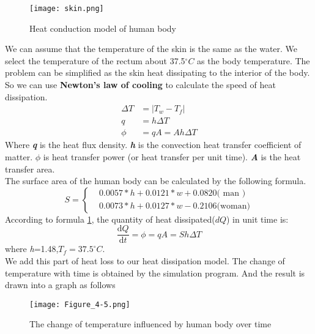\documentclass{mcmthesis}
\begin{document}
\begin{figure}[H]
\centerline{\texttt{[image: skin.png]}}
\caption{Heat conduction model of human body}
\label{skin}
\end{figure}
\indent We can assume that the temperature of the skin is the same as the water. We select the temperature of the rectum about 37.5$^{\circ}C$ as the body temperature. The problem can be simplified as the skin heat dissipating to the interior of the body.\\
\indent So we can use {\bf Newton's law of cooling} to calculate the speed of heat dissipation.\\
\begin{equation}
\begin{split}
\Delta T&=|T_{w}-T_{f}| \\
q&=h\Delta T	\\
\phi &=qA=Ah\Delta T
\end{split}
\end{equation}
\indent Where \textbf{\emph{q}} is the heat flux density. \textbf{\emph{h}} is the convection heat transfer coefficient of matter. \textbf{\emph{$\phi$}}  is heat transfer power (or heat transfer per unit time). \textbf{\emph{A}} is the heat transfer area.\\
\indent The surface area of the human body can be calculated by the following formula.
\begin{equation}
S= \begin{cases} & 0.0057*h+0.0121*w+0.0820\text{( man )} \\ & 0.0073*h+0.0127*w-0.2106\text{(woman)} \end{cases}
\label{s}
\end{equation}
\indent According to formula \ref{skin}, the quantity of heat dissipated($dQ$) in unit time is:
\begin{equation}
	\frac{\mathrm{d} Q}{\mathrm{d} t}=\phi =qA=Sh\Delta T
	\label{Q_skin}
\end{equation}
where \emph{h}=1.48,${T_{f}}=37.5^{\circ}C$. \\
\indent We add this part of heat loss to our heat dissipation model. The change of temperature with time is obtained by the simulation program. And the result is drawn into a graph as follows
\begin{figure}[H]
	\centerline{\texttt{[image: Figure\_4-5.png]}}
	\caption{The change of temperature influenced by human body over time}
	\label{s_person}	
\end{figure}
\end{document}
